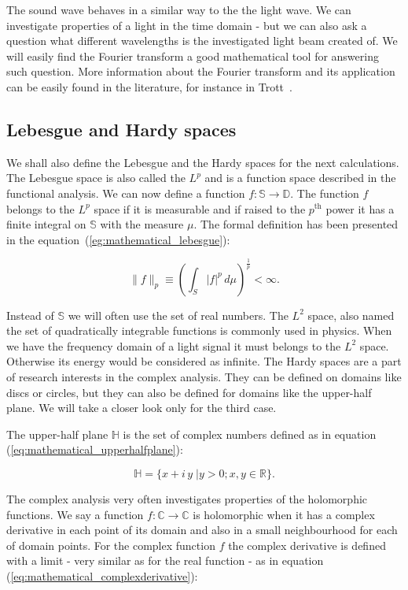 \documentclass[12pt,twoside,a4paper]{article}
\numberwithin{equation}{subsection}
\numberwithin{figure}{subsection}
\begin{document}
The sound wave behaves in a similar way to the the light wave. We can investigate properties of a light in the time domain - but we can also
ask a question what different wavelengths is the investigated light beam created of. We will easily find the Fourier transform a good
mathematical tool for answering such question. More information about the Fourier transform and its application can be easily found in the
literature, for instance in Trott~\cite{trott_mathematica}.

\subsection{Lebesgue and Hardy spaces}

We shall also define the Lebesgue and the Hardy spaces for the next calculations. The Lebesgue space is also called the $L^p$ and is a
function space described in the functional analysis. We can now define a function $f : \mathbb{S} \to \mathbb{D}$. The function $f$ belongs
to the $L^p$ space if it is measurable and if raised to the $p^{\text{th}}$ power it has a finite integral on $\mathbb{S}$ with the measure
$ \mu $. The formal definition has been presented in the equation~(\ref{eg:mathematical_lebesgue}):

\begin{equation} \label{eg:mathematical_lebesgue}
  \|f\|_p \equiv ( \int_{S} |f|^p \, d\mu) ^ {\frac{1}{p}} < \infty .
\end{equation}

Instead of $\mathbb{S}$ we will often use the set of real numbers. The $L^2$ space, also named the set of quadratically integrable functions
is commonly used in physics. When we have the frequency domain of a light signal it must belongs to the $L^2$ space. Otherwise its energy would
be considered as infinite. The Hardy spaces are a part of research interests in the complex analysis. They can be defined on domains like
discs or circles, but they can also be defined for domains like the upper-half plane. We will take a closer look only for the third case.

The upper-half plane $ \mathbb{H} $ is the set of complex numbers defined as in equation (\ref{eq:mathematical_upperhalfplane}):

\begin{equation} \label{eq:mathematical_upperhalfplane}
  \mathbb{H} = \{ x + i \, y \;| y > 0; x, y \in \mathbb{R} \} .
\end{equation}

The complex analysis very often investigates properties of the holomorphic functions. We say a function $f : \mathbb{C} \to \mathbb{C}$ is
holomorphic when it has a complex derivative in each point of its domain and also in a small neighbourhood for each of domain points. For
the complex function $f$ the complex derivative is defined with a limit - very similar as for the real function - as in equation
(\ref{eq:mathematical_complexderivative}):
\end{document}
